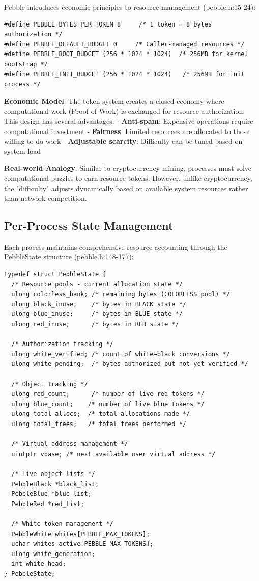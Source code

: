 \documentclass[11pt,letterpaper]{article}
\begin{document}
Pebble introduces economic principles to resource management (pebble.h:15-24):

\begin{lstlisting}
#define PEBBLE_BYTES_PER_TOKEN 8     /* 1 token = 8 bytes authorization */
#define PEBBLE_DEFAULT_BUDGET 0     /* Caller-managed resources */
#define PEBBLE_BOOT_BUDGET (256 * 1024 * 1024)  /* 256MB for kernel bootstrap */
#define PEBBLE_INIT_BUDGET (256 * 1024 * 1024)   /* 256MB for init process */
\end{lstlisting}

\textbf{Economic Model}: The token system creates a closed economy where computational work (Proof-of-Work) is exchanged for resource authorization. This design has several advantages:
- \textbf{Anti-spam}: Expensive operations require computational investment
- \textbf{Fairness}: Limited resources are allocated to those willing to do work
- \textbf{Adjustable scarcity}: Difficulty can be tuned based on system load

\textbf{Real-world Analogy}: Similar to cryptocurrency mining, processes must solve computational puzzles to earn resource tokens. However, unlike cryptocurrency, the "difficulty" adjusts dynamically based on available system resources rather than network competition.

\subsection{Per-Process State Management}

Each process maintains comprehensive resource accounting through the PebbleState structure (pebble.h:148-177):

\begin{lstlisting}
typedef struct PebbleState {
  /* Resource pools - current allocation state */
  ulong colorless_bank; /* remaining bytes (COLORLESS pool) */
  ulong black_inuse;    /* bytes in BLACK state */
  ulong blue_inuse;     /* bytes in BLUE state */
  ulong red_inuse;      /* bytes in RED state */
  
  /* Authorization tracking */
  ulong white_verified; /* count of white→black conversions */
  ulong white_pending;  /* bytes authorized but not yet verified */
  
  /* Object tracking */
  ulong red_count;      /* number of live red tokens */
  ulong blue_count;    /* number of live blue tokens */
  ulong total_allocs;  /* total allocations made */
  ulong total_frees;   /* total frees performed */
  
  /* Virtual address management */
  uintptr vbase; /* next available user virtual address */
  
  /* Live object lists */
  PebbleBlack *black_list;
  PebbleBlue *blue_list;
  PebbleRed *red_list;
  
  /* White token management */
  PebbleWhite whites[PEBBLE_MAX_TOKENS];
  uchar whites_active[PEBBLE_MAX_TOKENS];
  ulong white_generation;
  int white_head;
} PebbleState;
\end{lstlisting}
\end{document}
